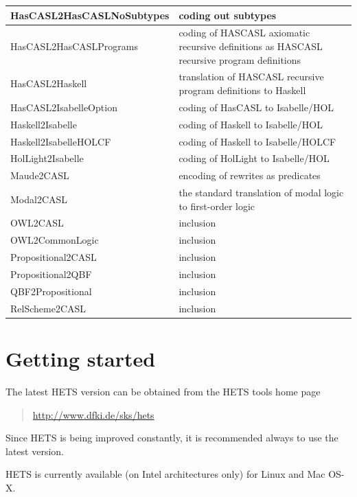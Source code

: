 \documentclass{article}
\newcommand{\normalTEXTSC}[2]{{#1\scriptsize#2}}
\newcommand     {\Hets}{\normalTEXTSC{H}{ETS}\xspace}
\newcommand     {\HasCASL}{\normalTEXTSC{H}{AS}\normalTEXTSC{C}{ASL}\xspace}
\begin{document}
\begin{tabular}{|l|p{7cm}|}\hline
HasCASL2HasCASLNoSubtypes & coding out subtypes \\\hline
HasCASL2HasCASLPrograms & coding of \HasCASL axiomatic recursive definitions
as \HasCASL recursive program definitions \\\hline
HasCASL2Haskell & translation of \HasCASL recursive program definitions to Haskell \\\hline
HasCASL2IsabelleOption & coding of HasCASL to Isabelle/HOL \cite{Groening05} \\\hline
Haskell2Isabelle & coding of Haskell to Isabelle/HOL \cite{TorriniEtAl07} \\\hline
Haskell2IsabelleHOLCF & coding of Haskell to Isabelle/HOLCF \cite{TorriniEtAl07} \\\hline
HolLight2Isabelle & coding of HolLight to Isabelle/HOL \\\hline
Maude2CASL & encoding of rewrites as predicates \\\hline
Modal2CASL & the standard translation of modal logic
to first-order logic \cite{blackburn_p-etal:2001a} \\\hline
OWL2CASL & inclusion \\\hline
OWL2CommonLogic & inclusion \\\hline
Propositional2CASL & inclusion \\\hline
Propositional2QBF & inclusion \\\hline
QBF2Propositional & inclusion \\\hline
RelScheme2CASL & inclusion \\\hline
\end{tabular}

\section{Getting started}

The latest \Hets version can be obtained from the
\Hets tools home page
\begin{quote}
\url{http://www.dfki.de/sks/hets}
\end{quote}
 Since \Hets is being
improved constantly, it is recommended always to use the latest version.

\Hets is currently available (on Intel architectures only) for Linux
and Mac OS-X.
\end{document}
